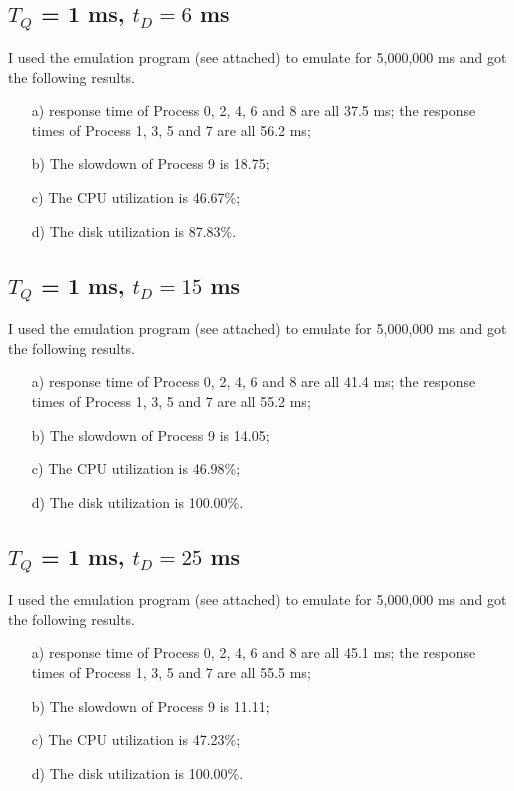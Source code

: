 \documentclass[12pt,letterpaper]{article}
\begin{document}
\subsection{$T_Q$ = 1 ms, $t_D=6$ ms}
I used the emulation program (see attached) to emulate for 5,000,000 ms and got the following results.
\begin{enumerate}
\item[a)] response time of Process 0, 2, 4, 6 and 8 are all 37.5 ms; the response times of Process 1, 3, 5 and 7 are all 56.2 ms;
\item[b)] The slowdown of Process 9 is 18.75;
\item[c)] The CPU utilization is 46.67\%;
\item[d)] The disk utilization is 87.83\%.
\end{enumerate}

\subsection{$T_Q$ = 1 ms, $t_D=15$ ms}
I used the emulation program (see attached) to emulate for 5,000,000 ms and got the following results.
\begin{enumerate}
\item[a)] response time of Process 0, 2, 4, 6 and 8 are all 41.4 ms; the response times of Process 1, 3, 5 and 7 are all 55.2 ms;
\item[b)] The slowdown of Process 9 is 14.05;
\item[c)] The CPU utilization is 46.98\%;
\item[d)] The disk utilization is 100.00\%.
\end{enumerate}

\subsection{$T_Q$ = 1 ms, $t_D=25$ ms}
I used the emulation program (see attached) to emulate for 5,000,000 ms and got the following results.
\begin{enumerate}
\item[a)] response time of Process 0, 2, 4, 6 and 8 are all 45.1 ms; the response times of Process 1, 3, 5 and 7 are all 55.5 ms;
\item[b)] The slowdown of Process 9 is 11.11;
\item[c)] The CPU utilization is 47.23\%;
\item[d)] The disk utilization is 100.00\%.
\end{enumerate}
\end{document}
